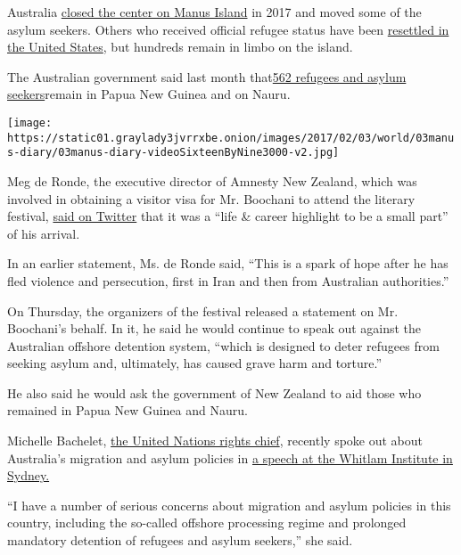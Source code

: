 Australia
\href{https://www.nytimes3xbfgragh.onion/2017/11/02/world/australia/manus-island-refugees.html?module=inline}{closed
the center on Manus Island} in 2017 and moved some of the asylum
seekers. Others who received official refugee status have been
\href{https://www.nytimes3xbfgragh.onion/2018/01/23/world/australia/manus-refugees-trump.html?module=inline}{resettled
in the United States}, but hundreds remain in limbo on the island.

The Australian government said last month
that\href{https://www.refugeecouncil.org.au/operation-sovereign-borders-offshore-detention-statistics/}{562
refugees and asylum seekers}remain in Papua New Guinea and on Nauru.

\texttt{[image: https://static01.graylady3jvrrxbe.onion/images/2017/02/03/world/03manus-diary/03manus-diary-videoSixteenByNine3000-v2.jpg]}

Meg de Ronde, the executive director of Amnesty New Zealand, which was
involved in obtaining a visitor visa for Mr. Boochani to attend the
literary festival,
\href{https://twitter.com/MegdeRonde/status/1194932484758110208}{said on
Twitter} that it was a ``life \& career highlight to be a small part''
of his arrival.

In an earlier statement, Ms. de Ronde said, ``This is a spark of hope
after he has fled violence and persecution, first in Iran and then from
Australian authorities.''

On Thursday, the organizers of the festival released a statement on Mr.
Boochani's behalf. In it, he said he would continue to speak out against
the Australian offshore detention system, ``which is designed to deter
refugees from seeking asylum and, ultimately, has caused grave harm and
torture.''

He also said he would ask the government of New Zealand to aid those who
remained in Papua New Guinea and Nauru.

Michelle Bachelet,
\href{https://www.abc.net.au/news/2019-10-09/un-bachelet-criticises-australia-asylum-seeker-policies/11588084?pfmredir=sm}{the
United Nations rights chief}, recently spoke out about Australia's
migration and asylum policies in
\href{https://www.whitlam.org/publications/2019/10/9/2019-whitlam-oration-un-human-rights-commissioner-michelle-bachelet}{a
speech at the Whitlam Institute in Sydney.}

``I have a number of serious concerns about migration and asylum
policies in this country, including the so-called offshore processing
regime and prolonged mandatory detention of refugees and asylum
seekers,'' she said.

